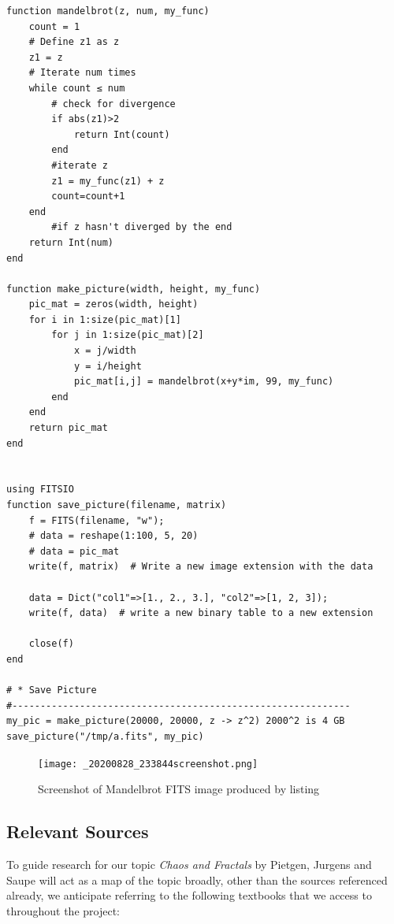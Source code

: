 \documentclass[11pt]{article}
\begin{document}
\lstset{language=julia,label,caption= ,captionpos=b,numbers=none}
\begin{lstlisting}
function mandelbrot(z, num, my_func)
    count = 1
    # Define z1 as z
    z1 = z
    # Iterate num times
    while count ≤ num
        # check for divergence
        if abs(z1)>2
            return Int(count)
        end
        #iterate z
        z1 = my_func(z1) + z
        count=count+1
    end
        #if z hasn't diverged by the end
    return Int(num)
end

function make_picture(width, height, my_func)
    pic_mat = zeros(width, height)
    for i in 1:size(pic_mat)[1]
        for j in 1:size(pic_mat)[2]
            x = j/width
            y = i/height
            pic_mat[i,j] = mandelbrot(x+y*im, 99, my_func)
        end
    end
    return pic_mat
end


using FITSIO
function save_picture(filename, matrix)
    f = FITS(filename, "w");
    # data = reshape(1:100, 5, 20)
    # data = pic_mat
    write(f, matrix)  # Write a new image extension with the data

    data = Dict("col1"=>[1., 2., 3.], "col2"=>[1, 2, 3]);
    write(f, data)  # write a new binary table to a new extension

    close(f)
end

# * Save Picture
#------------------------------------------------------------
my_pic = make_picture(20000, 20000, z -> z^2) 2000^2 is 4 GB
save_picture("/tmp/a.fits", my_pic)

\end{lstlisting}

\begin{figure}[htbp]
\centering
\texttt{[image: \_20200828\_233844screenshot.png]}
\caption{\label{mandelbrot-screen}Screenshot of Mandelbrot FITS image produced by listing }
\end{figure}
\subsection{Relevant Sources}
\label{sec:orge9ea707}
To guide research for our topic \emph{Chaos and Fractals} by Pietgen, Jurgens and Saupe \cite{peitgenChaosFractalsNew2004} will act as a map of the topic broadly, other than the sources referenced already, we anticipate referring to the following textbooks that we access to throughout the project:
\end{document}
